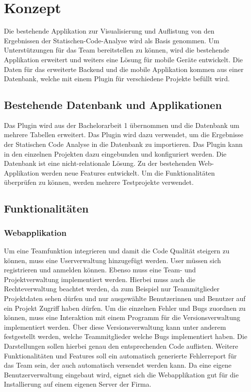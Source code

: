 \chapter{Konzept}
\label{chap:concept}
\chapterstart

Die bestehende Applikation zur Visualisierung und Auflistung von den Ergebnissen der Statischen-Code-Analyse wird als Basis genommen. Um Unterstützungen für das Team bereitstellen zu können, wird die bestehende Applikation erweitert und weiters eine Lösung für mobile Geräte entwickelt. Die Daten für das erweiterte Backend und die mobile Applikation kommen aus einer Datenbank, welche mit einem Plugin für verschiedene Projekte befüllt wird.

\section{Bestehende Datenbank und Applikationen}
Das Plugin wird aus der Bachelorarbeit 1 übernommen und die Datenbank um mehrere Tabellen erweitert. Das Plugin wird dazu verwendet, um die Ergebnisse der Statischen Code Analyse in die Datenbank zu importieren. Das Plugin kann in den einzelnen Projekten dazu eingebunden und konfiguriert werden. Die Datenbank ist eine nicht-relationale Lösung. Zu der bestehenden Web-Applikation werden neue Features entwickelt. Um die Funktionalitäten überprüfen zu können, werden mehrere Testprojekte verwendet. 

\section{Funktionalitäten}
\subsection{Webapplikation}
Um eine Teamfunktion integrieren und damit die Code Qualität steigern zu können, muss eine Userverwaltung hinzugefügt werden. User müssen sich registrieren und anmelden können. Ebenso muss eine Team- und Projektverwaltung implementiert werden. Hierbei muss auch die Rechteverwaltung beachtet werden, da zum Beispiel nur Teammitglieder Projektdaten sehen dürfen und nur ausgewählte Benutzerinnen und Benutzer auf ein Projekt Zugriff haben dürfen. Um die einzelnen Fehler und Bugs zuordnen zu können, muss eine Interaktion mit einem Programm für die Versionsverwaltung implementiert werden. Über diese Versionsverwaltung kann unter anderem festgestellt werden, welche Teammitglieder welche Bugs implementiert haben. Die Darstellungen sollen hierbei genau den entsprechenden Code auflisten. Weitere Funktionalitäten und Features soll ein automatisch generierte Fehlerreport für das Team sein, der auch automatisch versendet werden kann. Da eine eigene Benutzerverwaltung eingebaut wird, eignet sich die Webapplikation gut für die Installierung auf einem eigenen Server der Firma.

